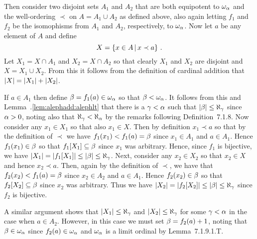 \begin{solution}
    Then consider two disjoint sets $A_1$ and $A_2$ that are both equipotent to $\omega_\alpha$ and the well-ordering $\prec$ on $A = A_1 \cup A_2$ as defined above, also again letting $f_1$ and $f_2$ be the isomophisms from $A_1$ and $A_2$, respectively, to $\omega_\alpha$.
    Now let $a$ be any element of $A$ and define
    $$
    X = \left\{ x \in A \,|\, x \prec a \right\} \,.
    $$
    Let $X_1 = X \cap A_1$ and $X_2 = X \cap A_2$ so that clearly $X_1$ and $X_2$ are disjoint and $X = X_1 \cup X_2$.
    From this it follows from the definition of cardinal addition that $\left| X \right| = \left| X_1 \right| + \left| X_2 \right|$.

    If $a \in A_1$ then define $\beta = f_1(a) \in \omega_\alpha$ so that $\beta < \omega_\alpha$.
    It follows from this and Lemma~\ex.\ref{lem:alephadd:alephlt} that there is a $\gamma < \alpha$ such that $\left| \beta \right| \leq \aleph_\gamma$ since $\alpha > 0$, noting also that $\aleph_\gamma < \aleph_\alpha$ by the remarks following Definition~7.1.8.
    Now consider any $x_1 \in X_1$ so that also $x_1 \in X$.
    Then by definition $x_1 \prec a$ so that by the definition of $\prec$ we have $f_1(x_1) < f_1(a) = \beta$ since $x_1 \in A_1$ and $a \in A_1$.
    Hence $f_1(x_1) \in \beta$ so that $f_1[X_1] \subseteq \beta$ since $x_1$ was arbitrary.
    Hence, since $f_1$ is bijective, we have $\left| X_1 \right| = \left| f_1[X_1] \right| \leq \left| \beta \right| \leq \aleph_\gamma$.
    Next, consider any $x_2 \in X_2$ so that $x_2 \in X$ and hence $x_2 \prec a$.
    Then, again by the definition of $\prec$, we have that $f_2(x_2) < f_1(a) = \beta$ since $x_2 \in A_2$ and $a \in A_1$.
    Hence $f_2(x_2) \in \beta$ so that $f_2[X_2] \subseteq \beta$ since $x_2$ was arbitrary.
    Thus we have $\left| X_2 \right| = \left| f_2[X_2] \right| \leq \left| \beta \right| \leq \aleph_\gamma$ since $f_2$ is bijective.

    A similar argument shows that $\left| X_1 \right| \leq \aleph_\gamma$ and $\left| X_2 \right| \leq \aleph_\gamma$ for some $\gamma < \alpha$ in the case when $a \in A_2$.
    However, in this case we must set $\beta = f_2(a) + 1$, noting that $\beta \in \omega_\alpha$ since $f_2(a) \in \omega_\alpha$ and $\omega_\alpha$ is a limit ordinal by Lemma~7.1.9.1.T.


\end{solution}
